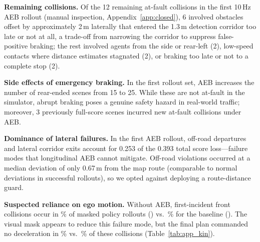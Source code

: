 \documentclass{article}
\begin{document}
\textbf{Remaining collisions.} Of the 12 remaining at-fault collisions in the first 10\,Hz AEB rollout (manual inspection, Appendix~\ref{app:closed}), 6 involved obstacles offset by approximately 2\,m laterally that entered the 1.3\,m detection corridor too late or not at all, a trade-off from narrowing the corridor to suppress false-positive braking; the rest involved agents from the side or rear-left (2), low-speed contacts where distance estimates stagnated (2), or braking too late or not to a complete stop (2).

\textbf{Side effects of emergency braking.} In the first rollout set, AEB increases the number of rear-ended scenes from 15 to 25. While these are not at-fault in the simulator, abrupt braking poses a genuine safety hazard in real-world traffic; moreover, 3 previously full-score scenes incurred new at-fault collisions under AEB.

\textbf{Dominance of lateral failures.} In the first AEB rollout, off-road departures and lateral corridor exits account for 0.253 of the 0.393 total score loss---failure modes that longitudinal AEB cannot mitigate. Off-road violations occurred at a median deviation of only 0.67\,m from the map route (comparable to normal deviations in successful rollouts), so we opted against deploying a route-distance guard.

\textbf{Suspected reliance on ego motion.} Without AEB, first-incident front collisions occur in \RMaskFrontRate\% of masked policy rollouts (\RMaskFrontN) vs.\ \RBaseFrontRate\% for the baseline (\RBaseFrontN). The visual mask appears to reduce this failure mode, but the final plan commanded no deceleration in \RMaskNoSlow\% vs.\ \RBaseNoSlow\% of these collisions (Table~\ref{tab:app_kin}).




\appendix

\end{document}
